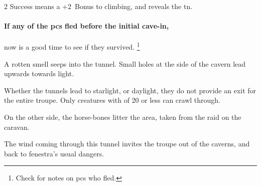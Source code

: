 \begin{multicols}{2}
Success means a +2~Bonus to climbing, and reveals the \gls{tn}.

\paragraph{If any of the \glspl{pc} fled before the initial cave-in,}
now is a good time to see if they survived.%
\footnote{Check  for notes on \glspl{pc} who fled.}



\begin{boxtext}
  A rotten smell seeps into the tunnel.
  Small holes at the side of the cavern lead upwards towards light.
\end{boxtext}

Whether the tunnels lead to starlight, or daylight, they do not provide an exit for the entire troupe.
Only creatures with  of 20 or less can crawl through.

On the other side, the horse-bones litter the area, taken from the raid on the caravan.



The wind coming through this tunnel invites the troupe out of the caverns, and back to \gls{fenestra}'s usual dangers.

\end{multicols}

\metroMapDistances[t]

